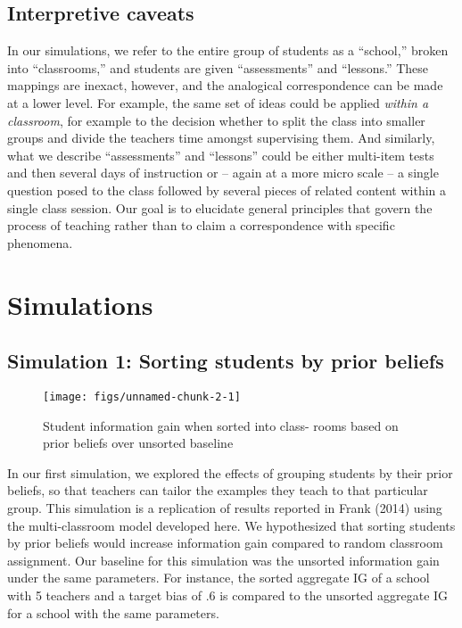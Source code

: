 \documentclass[10pt, letterpaper]{article}
\newenvironment{CodeChunk}{}{}
\begin{document}
\subsection{Interpretive caveats}\label{interpretive-caveats}

In our simulations, we refer to the entire group of students as a
``school,'' broken into ``classrooms,'' and students are given
``assessments'' and ``lessons.'' These mappings are inexact, however,
and the analogical correspondence can be made at a lower level. For
example, the same set of ideas could be applied \emph{within a
classroom}, for example to the decision whether to split the class into
smaller groups and divide the teachers time amongst supervising them.
And similarly, what we describe ``assessments'' and ``lessons'' could be
either multi-item tests and then several days of instruction or -- again
at a more micro scale -- a single question posed to the class followed
by several pieces of related content within a single class session. Our
goal is to elucidate general principles that govern the process of
teaching rather than to claim a correspondence with specific phenomena.

\section{Simulations}\label{simulations}

\subsection{Simulation 1: Sorting students by prior
beliefs}\label{simulation-1-sorting-students-by-prior-beliefs}

\begin{CodeChunk}
\begin{figure}[tb]
\texttt{[image: figs/unnamed-chunk-2-1]} \caption[Student information gain when sorted into class- rooms based on prior beliefs over unsorted baseline]{Student information gain when sorted into class- rooms based on prior beliefs over unsorted baseline}\label{fig:unnamed-chunk-2}
\end{figure}
\end{CodeChunk}

In our first simulation, we explored the effects of grouping students by
their prior beliefs, so that teachers can tailor the examples they teach
to that particular group. This simulation is a replication of results
reported in Frank (2014) using the multi-classroom model developed here.
We hypothesized that sorting students by prior beliefs would increase
information gain compared to random classroom assignment. Our baseline
for this simulation was the unsorted information gain under the same
parameters. For instance, the sorted aggregate IG of a school with 5
teachers and a target bias of .6 is compared to the unsorted aggregate
IG for a school with the same parameters.
\end{document}
